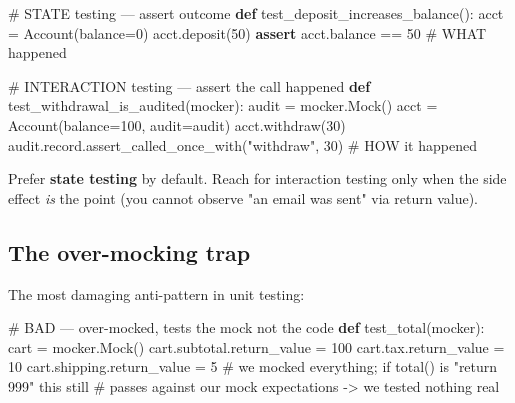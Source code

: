 \documentclass[11pt]{article}
\newenvironment{Shaded}{\begin{snugshade}}{\end{snugshade}}
\newcommand{\CommentTok}[1]{\textcolor[rgb]{0.48,0.49,0.49}{#1}}
\newcommand{\ControlFlowTok}[1]{\textcolor[rgb]{0.99,0.74,0.29}{\textbf{#1}}}
\newcommand{\DecValTok}[1]{\textcolor[rgb]{0.96,0.45,0.00}{#1}}
\newcommand{\KeywordTok}[1]{\textcolor[rgb]{0.81,0.81,0.76}{\textbf{#1}}}
\newcommand{\NormalTok}[1]{\textcolor[rgb]{0.81,0.81,0.76}{#1}}
\newcommand{\OperatorTok}[1]{\textcolor[rgb]{0.81,0.81,0.76}{#1}}
\newcommand{\StringTok}[1]{\textcolor[rgb]{0.96,0.31,0.31}{#1}}
\begin{document}

\begin{Shaded}
\begin{Highlighting}[]
\CommentTok{\# STATE testing — assert outcome}
\KeywordTok{def}\NormalTok{ test\_deposit\_increases\_balance():}
\NormalTok{    acct }\OperatorTok{=}\NormalTok{ Account(balance}\OperatorTok{=}\DecValTok{0}\NormalTok{)}
\NormalTok{    acct.deposit(}\DecValTok{50}\NormalTok{)}
    \ControlFlowTok{assert}\NormalTok{ acct.balance }\OperatorTok{==} \DecValTok{50}          \CommentTok{\# WHAT happened}

\CommentTok{\# INTERACTION testing — assert the call happened}
\KeywordTok{def}\NormalTok{ test\_withdrawal\_is\_audited(mocker):}
\NormalTok{    audit }\OperatorTok{=}\NormalTok{ mocker.Mock()}
\NormalTok{    acct }\OperatorTok{=}\NormalTok{ Account(balance}\OperatorTok{=}\DecValTok{100}\NormalTok{, audit}\OperatorTok{=}\NormalTok{audit)}
\NormalTok{    acct.withdraw(}\DecValTok{30}\NormalTok{)}
\NormalTok{    audit.record.assert\_called\_once\_with(}\StringTok{"withdraw"}\NormalTok{, }\DecValTok{30}\NormalTok{)  }\CommentTok{\# HOW it happened}
\end{Highlighting}
\end{Shaded}

Prefer \textbf{state testing} by default. Reach for interaction testing only when the side effect \emph{is} the point (you cannot observe "an email was sent" via return value).

\subsection{The over-mocking trap}\label{the-over-mocking-trap}

The most damaging anti-pattern in unit testing:


\begin{Shaded}
\begin{Highlighting}[]
\CommentTok{\# BAD — over{-}mocked, tests the mock not the code}
\KeywordTok{def}\NormalTok{ test\_total(mocker):}
\NormalTok{    cart }\OperatorTok{=}\NormalTok{ mocker.Mock()}
\NormalTok{    cart.subtotal.return\_value }\OperatorTok{=} \DecValTok{100}
\NormalTok{    cart.tax.return\_value }\OperatorTok{=} \DecValTok{10}
\NormalTok{    cart.shipping.return\_value }\OperatorTok{=} \DecValTok{5}
    \CommentTok{\# we mocked everything; if total() is "return 999" this still}
    \CommentTok{\# passes against our mock expectations {-}\textgreater{} we tested nothing real}
\end{Highlighting}
\end{Shaded}
\end{document}

